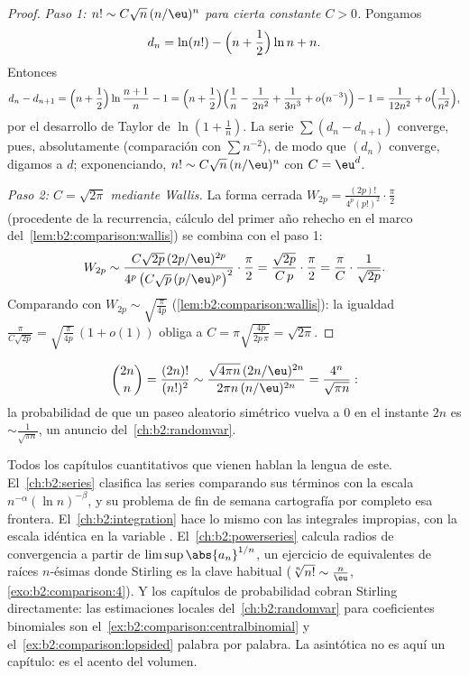 \begin{proof}
\emph{Paso 1: $n! \sim C \sqrt n\, (n/\eu)^n$ para cierta constante
$C > 0$.} Pongamos
\[
d_n = \ln(n!) - \Bigl(n + \frac12\Bigr)\ln n + n .
\]
Entonces
\[
d_n - d_{n+1}
= \Bigl(n + \frac12\Bigr) \ln\frac{n+1}{n} - 1
= \Bigl(n + \frac12\Bigr)\Bigl(\frac1n - \frac{1}{2n^2} +
\frac{1}{3n^3} + o\bigl(n^{-3}\bigr)\Bigr) - 1
= \frac{1}{12n^2} + o\Bigl(\frac{1}{n^2}\Bigr),
\]
por el desarrollo de Taylor de $\ln(1 + \frac1n)$. La serie $\sum
(d_n - d_{n+1})$ converge, pues, absolutamente (comparación con
$\sum n^{-2}$), de modo que $(d_n)$ converge, digamos a $d$;
exponenciando, $n! \sim C\sqrt n\,(n/\eu)^n$ con $C = \eu^{d}$.

\emph{Paso 2: $C = \sqrt{2\pi}$ mediante Wallis.} La forma cerrada
$W_{2p} = \frac{(2p)!}{4^p (p!)^2}\cdot\frac\pi2$ (procedente de la
recurrencia, cálculo del primer año rehecho en el marco del~\cref{lem:b2:comparison:wallis}) se combina con el paso 1:
\[
W_{2p} \sim \frac{C\sqrt{2p}\,(2p/\eu)^{2p}}
{4^p\,\bigl(C\sqrt p\,(p/\eu)^p\bigr)^2}\cdot\frac{\pi}{2}
= \frac{\sqrt{2p}}{C\,p}\cdot\frac{\pi}{2}
= \frac{\pi}{C}\cdot\frac{1}{\sqrt{2p}} .
\]
Comparando con $W_{2p} \sim \sqrt{\frac{\pi}{4p}}$
(\cref{lem:b2:comparison:wallis}): la igualdad
$\frac{\pi}{C\sqrt{2p}} = \sqrt{\frac{\pi}{4p}}\,(1 + o(1))$ obliga
a $C = \pi \sqrt{\frac{4p}{2p\,\pi}} = \sqrt{2\pi}$.
\end{proof}

\begin{example}\label{ex:b2:comparison:centralbinomial}
\[
\binom{2n}{n} = \frac{(2n)!}{(n!)^2}
\sim \frac{\sqrt{4\pi n}\,(2n/\eu)^{2n}}{2\pi n\,(n/\eu)^{2n}}
= \frac{4^n}{\sqrt{\pi n}} :
\]
la probabilidad de que un paseo aleatorio simétrico vuelva a $0$ en
el instante $2n$ es $\sim \frac{1}{\sqrt{\pi n}}$, un anuncio del~\cref{ch:b2:randomvar}.
\end{example}

\begin{remark}\label{rem:b2:comparison:perspectives}
Todos los capítulos cuantitativos que vienen hablan la lengua de
este. El~\cref{ch:b2:series} clasifica las series comparando sus
términos con la escala $n^{-\alpha}(\ln n)^{-\beta}$, y su problema
de fin de semana cartografía por completo esa frontera. El~\cref{ch:b2:integration} hace lo mismo con las integrales
impropias, con la escala idéntica en la variable . El~\cref{ch:b2:powerseries} calcula radios de convergencia a partir de
$\limsup\abs{a_n}^{1/n}$, un ejercicio de equivalentes de raíces
$n$-ésimas donde Stirling es la clave habitual ($\sqrt[n]{n!} \sim
\frac n\eu$, \cref{exo:b2:comparison:4}). Y los capítulos de
probabilidad cobran Stirling directamente: las estimaciones locales
del~\cref{ch:b2:randomvar} para coeficientes binomiales son el~\cref{ex:b2:comparison:centralbinomial} y el~\cref{ex:b2:comparison:lopsided} palabra por palabra. La asintótica
no es aquí un capítulo: es el acento del volumen.
\end{remark}

